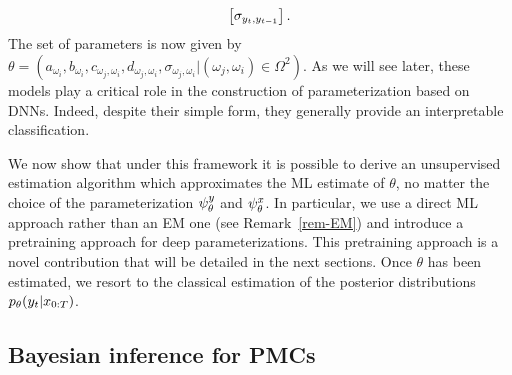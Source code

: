 \begin{example}
\begin{eqnarray}
\begin{bmatrix}
  \sigma_{y_t,y_{t-1}}\end{bmatrix} \text{.} 
  \end{eqnarray}
  The set of parameters is now given by 
  $\theta=(a_{\omega_i},b_{\omega_i},c_{\omega_j,\omega_i},
  d_{\omega_j,\omega_i}, \sigma_{\omega_j,\omega_i}|
   (\omega_j,\omega_i) \in \Omega^2 )$.
  As we will see later, these models play a critical role in the construction of parameterization based on DNNs. Indeed, despite their simple form, they generally provide an interpretable classification. 
\end{example}

We now show that under this framework it is possible to derive an unsupervised
estimation algorithm which approximates the ML estimate of $\theta$,
no matter the choice of the parameterization $\psi^{y}_{\theta}$ and $\psi^{x}_{\theta}$.
In particular, we use a direct ML approach rather than an EM one (see
Remark~\ref{rem-EM}) and introduce a pretraining approach for deep
parameterizations. This pretraining approach is a novel contribution that will
be detailed in the next sections. 
Once $\theta$ has been estimated, we resort to the classical
estimation of the posterior distributions $p_{\theta}(y_t|x_{0:T})$.



\subsection{Bayesian inference for PMCs}
\label{sec:inference_pmc}




